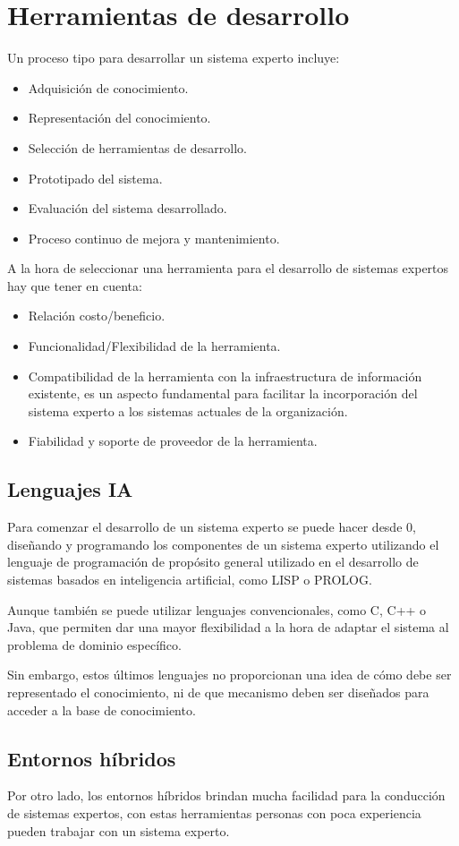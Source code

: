 \documentclass[12pt, twoside, openright]{report} %
\begin{document}
\section{Herramientas de desarrollo}
Un proceso tipo para desarrollar un sistema experto incluye:
\begin{itemize}
	\item Adquisición de conocimiento.
	\item Representación del conocimiento.
	\item Selección de herramientas de desarrollo.
	\item Prototipado del sistema.
	\item Evaluación del sistema desarrollado.
	\item Proceso continuo de mejora y mantenimiento.
\end{itemize}
A la hora de seleccionar una herramienta para el desarrollo de sistemas expertos hay que tener en cuenta:
\begin{itemize}
	\item Relación costo/beneficio.
	\item Funcionalidad/Flexibilidad de la herramienta.
	\item Compatibilidad de la herramienta con la infraestructura de información existente, es un aspecto fundamental para facilitar la incorporación del sistema experto a los sistemas actuales de la organización.
	\item Fiabilidad y soporte de proveedor de la herramienta.
\end{itemize}
\subsection{Lenguajes IA}
Para comenzar el desarrollo de un sistema experto se puede hacer desde 0, diseñando y programando los componentes de un sistema experto utilizando el lenguaje de programación de propósito general utilizado en el desarrollo de sistemas basados en inteligencia artificial, como LISP o PROLOG.

Aunque también se puede utilizar lenguajes convencionales, como C, C++ o Java, que permiten dar una mayor flexibilidad a la hora de adaptar el sistema al problema de dominio específico. 

Sin embargo, estos últimos lenguajes no proporcionan una idea de cómo debe ser representado el conocimiento, ni de que mecanismo deben ser diseñados para acceder a la base de conocimiento.

\subsection{Entornos híbridos}
Por otro lado, los entornos híbridos brindan mucha facilidad para la conducción de sistemas expertos, con estas herramientas personas con poca experiencia pueden trabajar con un sistema experto. 
\end{document}
